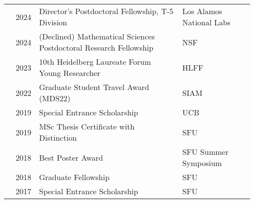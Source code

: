 \documentclass[letterpaper,11pt,oneside]{article}
\begin{document}
\begin{tabular}{@{} p{0.00cm} p{1cm} p{9cm} p{8cm}}
& 2024 & Director's Postdoctoral Fellowship, T-5 Division & Los Alamos National Labs \\
& 2024 & (Declined) Mathematical Sciences Postdoctoral Research Fellowship & NSF \\
& 2023 & 10th Heidelberg Laureate Forum Young Researcher & HLFF \\
& 2022 & Graduate Student Travel Award (MDS22) & SIAM \\
& 2019 & Special Entrance Scholarship & UCB \\
& 2019 & MSc Thesis Certificate with Distinction & SFU \\
& 2018 & Best Poster Award & SFU Summer Symposium \\
& 2018 & Graduate Fellowship & SFU \\
& 2017 & Special Entrance Scholarship & SFU \\
\end{tabular}
\end{document}
